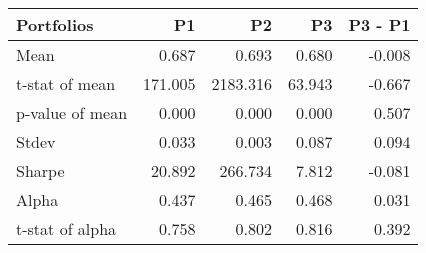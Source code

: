 \begin{tabular}{lrrrr}
\toprule
Portfolios & P1 & P2 & P3 & P3 - P1 \\
\midrule
Mean & 0.687 & 0.693 & 0.680 & -0.008 \\
t-stat of mean & 171.005 & 2183.316 & 63.943 & -0.667 \\
p-value of mean & 0.000 & 0.000 & 0.000 & 0.507 \\
Stdev & 0.033 & 0.003 & 0.087 & 0.094 \\
Sharpe & 20.892 & 266.734 & 7.812 & -0.081 \\
Alpha & 0.437 & 0.465 & 0.468 & 0.031 \\
t-stat of alpha & 0.758 & 0.802 & 0.816 & 0.392 \\
\bottomrule
\end{tabular}
